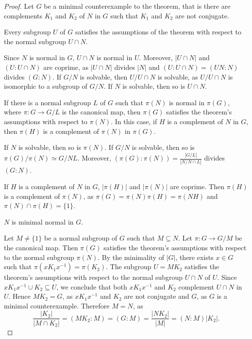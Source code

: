 \begin{proof}
	Let $G$ be a minimal counterexample to the theorem, that is there are complements $K_1$ and 
	$K_2$ of $N$ in $G$ such that $K_1$ and $K_2$ are not conjugate. 

	\begin{claim}
		Every subgroup $U$ of $G$ satisfies the assumptions of the theorem with respect to the normal subgroup 
        $U\cap N$.
	\end{claim}
	
	Since $N$ is normal in $G$, $U\cap N$ is normal in $U$. Moreover, $|U\cap N|$ and 
	$(U:U\cap N)$ are coprime, as $|U\cap N|$ divides $|N|$ and $(U:U\cap
	N)=(UN:N)$ divides $(G:N)$.  If $G/N$ is solvable, then $U/U\cap N$
	is solvable, as $U/U\cap N$ is isomorphic to a subgroup of $G/N$. If $N$ is 
	solvable, then so is $U\cap N$.
%

	\begin{claim}
		If there is a normal subgroup $L$ of $G$ such that $\pi(N)$ is normal in 
		$\pi(G)$, where $\pi\colon G\to G/L$ is the canonical map, then 
    	$\pi(G)$ satisfies the theorem's assumptions with respect to $\pi(N)$.
		In this case, if $H$  is a complement of $N$ in $G$, then $\pi(H)$ 
		is a complement of $\pi(N)$ in $\pi(G)$.
	\end{claim}

	If $N$ is solvable, then so is $\pi(N)$. If $G/N$ is solvable, then so is 
	$\pi(G)/\pi(N)\simeq G/NL$. Moreover, 
	$(\pi(G):\pi(N))=\frac{|G/L|}{|N/N\cap L|}$ divides $(G:N)$. 
	
	If $H$ is a complement of $N$ in $G$, $|\pi(H)|$ and $|\pi(N)|$ are 
	coprime. Then $\pi(H)$ is a complement of $\pi(N)$, as 
	$\pi(G)=\pi(N)\pi(H)=\pi(NH)$ and 
	$\pi(N)\cap\pi(H)=\{1\}$. 

	\begin{claim}
		$N$ is minimal normal in $G$.
	\end{claim}

	Let $M\ne\{1\}$ be a normal subgroup of $G$ such that $M\subseteq N$. Let $\pi\colon G\to G/M$ be the canonical map. 
	Then $\pi(G)$ satisfies the theorem's assumptions with respect to the normal subgroup 
	$\pi(N)$. By the minimality of $|G|$, there exists 
	$x\in G$ such that $\pi(xK_1x^{-1})=\pi(K_2)$. The subgroup 
	$U=MK_2$ satisfies the theorem's assumptions with respect to the normal subgroup 
	$U\cap N$ of $U$. Since $xK_1x^{-1}\cup K_2\subseteq U$,
	we conclude that both $xK_1x^{-1}$ and $K_2$ complement $U\cap N$ in $U$.
	Hence $MK_2=G$, as $xK_1x^{-1}$ and $K_2$ are not conjugate and $G$, as $G$
        is a minimal counterexample. 
	Therefore $M=N$, as 
	\[
		\frac{|K_2|}{|M\cap K_2|}=(MK_2:M)=(G:M)=\frac{|NK_2|}{|M|}=(N:M)|K_2|.
	\]


\end{proof}
